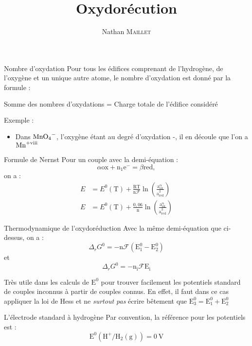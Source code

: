 \documentclass[french, a4paper, 11pt, twocolumn]{article}
\title{Oxydorécution}
\author{Nathan \textsc{Maillet}}
\date{}
\newcommand{\RNum}[1]{\uppercase\expandafter{\romannumeral #1\relax}}
\newcommand{\po}{\left(}         %
\newcommand{\pf}{\right)}        %
\newcommand{\pof}[1]{\po #1 \pf} %
\begin{document}
    \maketitle

    \begin{cadre}{Nombre d'oxydation}
        Pour tous les édifices comprenant de l'hydrogène, de l'oxygène et un unique autre atome, le nombre d'oxydation
        est donné par la formule :
        
        Somme des nombres d'oxydations = Charge totale de l'édifice considéré

        \tcblower
        Exemple :
        \begin{itemize}
            \item Dans \(\ce{MnO4-}\), l'oxygène étant au degré d'oxydation -\RNum{2},
            il en découle que l'on a \(\ce{Mn^{+\RNum{8}}}\) 
        \end{itemize}
    \end{cadre}

    \begin{cadre}{Formule de Nernst}
        Pour un couple avec la demi-équation :
        \[\alpha \mathrm{ox} + \mathrm{n_1} \mathrm{e^-} = \beta \mathrm{red},\] on a :
        \begin{align*}
            E &=E^0(\mathrm{T})+\frac{\mathrm{RT}}{\mathrm{n}\mathcal{F}}\ln\pof{\frac{\mathrm{a_{ox}^{\alpha}}}{\mathrm{a_{red}^{\beta}}}} \\
            E &=E^0(\mathrm{T})+\frac{0,06}{\mathrm{n}}\ln\pof{\frac{\mathrm{a_{ox}^{\alpha}}}{\mathrm{a_{red}^{\beta}}}}
        \end{align*}
    \end{cadre}

    \begin{cadre}{Thermodynamique de l'oxydoréduction}
        Avec la même demi-équation que ci-dessus, on a :
        \[\Delta_rG^0=-\mathrm{n}\mathcal{F}(\mathrm{E^0_1-E^0_2})\]
        et
        \[\Delta_rG^0=-\mathrm{n_i}\mathcal{F}\mathrm{E_i}\]

        \tcblower
        Très utile dans les calculs de \(\mathrm{E^0}\) pour trouver facilement les potentiels standard de couples inconnus
        à partir de couples connus. En effet, il faut dans ce cas appliquer la loi de Hess et ne \emph{surtout pas} écrire bêtement
        que \(\mathrm{E^0_3=E^0_1+E^0_2}\)
    \end{cadre}

    \begin{cadre}{L'électrode standard à hydrogène}
        Par convention, la référence pour les potentiels est :
        \[\mathrm{E^0(H^+/H_2(g))=\SI{0}{\volt}}\]
    \end{cadre}
\end{document}
